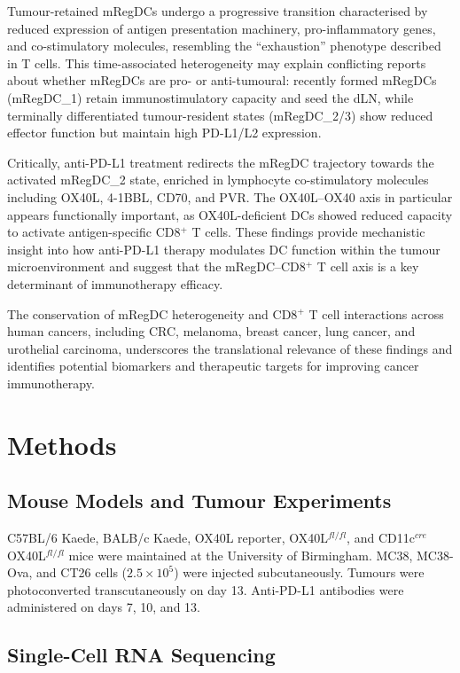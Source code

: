 \documentclass[11pt]{article}
\begin{document}
Tumour-retained mRegDCs undergo a progressive transition characterised by reduced expression of antigen presentation machinery, pro-inflammatory genes, and co-stimulatory molecules, resembling the ``exhaustion'' phenotype described in T cells. This time-associated heterogeneity may explain conflicting reports about whether mRegDCs are pro- or anti-tumoural: recently formed mRegDCs (mRegDC\_1) retain immunostimulatory capacity and seed the dLN, while terminally differentiated tumour-resident states (mRegDC\_2/3) show reduced effector function but maintain high PD-L1/L2 expression.

Critically, anti-PD-L1 treatment redirects the mRegDC trajectory towards the activated mRegDC\_2 state, enriched in lymphocyte co-stimulatory molecules including OX40L, 4-1BBL, CD70, and PVR. The OX40L--OX40 axis in particular appears functionally important, as OX40L-deficient DCs showed reduced capacity to activate antigen-specific CD8$^+$ T cells. These findings provide mechanistic insight into how anti-PD-L1 therapy modulates DC function within the tumour microenvironment and suggest that the mRegDC--CD8$^+$ T cell axis is a key determinant of immunotherapy efficacy.

The conservation of mRegDC heterogeneity and CD8$^+$ T cell interactions across human cancers, including CRC, melanoma, breast cancer, lung cancer, and urothelial carcinoma, underscores the translational relevance of these findings and identifies potential biomarkers and therapeutic targets for improving cancer immunotherapy.

\section{Methods}

\subsection{Mouse Models and Tumour Experiments}

C57BL/6 Kaede, BALB/c Kaede, OX40L reporter, OX40L$^{fl/fl}$, and CD11c$^{cre}$ OX40L$^{fl/fl}$ mice were maintained at the University of Birmingham. MC38, MC38-Ova, and CT26 cells ($2.5 \times 10^5$) were injected subcutaneously. Tumours were photoconverted transcutaneously on day 13. Anti-PD-L1 antibodies were administered on days 7, 10, and 13.

\subsection{Single-Cell RNA Sequencing}
\end{document}
